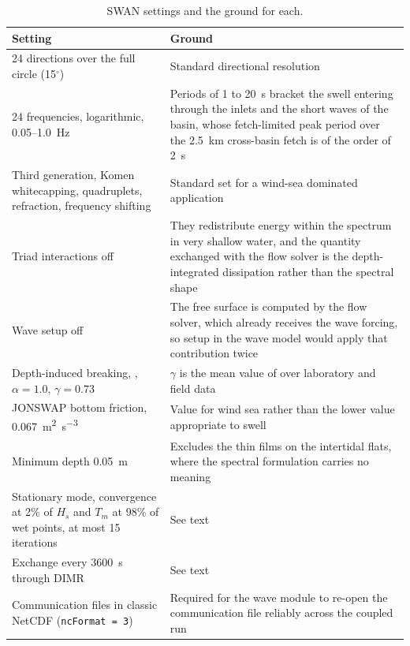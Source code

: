 \documentclass[12pt]{article}
\begin{document}
\begin{table}[H]
  \centering
  \caption{SWAN settings and the ground for each.}
  \label{tab:swan}
  \small
  \begin{tabular}{p{}p{}}
    \toprule
    Setting & Ground \\
    \midrule
    24 directions over the full circle (15$^\circ$) & Standard directional resolution \\
    24 frequencies, logarithmic, 0.05--1.0~Hz & Periods of 1 to 20~s bracket the swell entering through the inlets and the short waves of the basin, whose fetch-limited peak period over the 2.5~km cross-basin fetch is of the order of 2~s \\
    Third generation, Komen whitecapping, quadruplets, refraction, frequency shifting & Standard set for a wind-sea dominated application \\
    Triad interactions off & They redistribute energy within the spectrum in very shallow water, and the quantity exchanged with the flow solver is the depth-integrated dissipation rather than the spectral shape \\
    Wave setup off & The free surface is computed by the flow solver, which already receives the wave forcing, so setup in the wave model would apply that contribution twice \\
    Depth-induced breaking, \citet{BattjesJanssen1978}, $\alpha = 1.0$, $\gamma = 0.73$ & $\gamma$ is the mean value of \citet{BattjesStive1985} over laboratory and field data \\
    JONSWAP bottom friction, 0.067~\si{\metre\squared\per\cubic\second} & Value for wind sea rather than the lower value appropriate to swell \citep{BouwsKomen1983} \\
    Minimum depth 0.05~m & Excludes the thin films on the intertidal flats, where the spectral formulation carries no meaning \\
    Stationary mode, convergence at 2\% of $H_s$ and $T_m$ at 98\% of wet points, at most 15 iterations & See text \\
    Exchange every 3600~s through DIMR & See text \\
    Communication files in classic NetCDF (\texttt{ncFormat = 3}) & Required for the wave module to re-open the communication file reliably across the coupled run \\
    \bottomrule
  \end{tabular}
\end{table}
\end{document}
